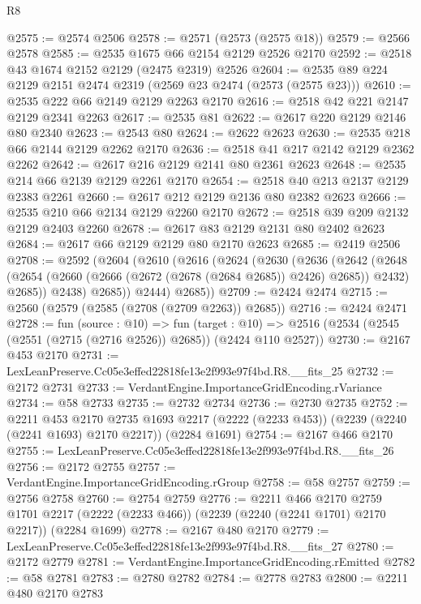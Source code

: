 \begin{lexlean}{R8}
\begin{coremodule}
@2575 := @2574 @2506
@2578 := @2571 (@2573 (@2575 @18))
@2579 := @2566 @2578
@2585 := @2535 @1675 @66 @2154 @2129 @2526 @2170
@2592 := @2518 @43 @1674 @2152 @2129 (@2475 @2319) @2526
@2604 := @2535 @89 @224 @2129 @2151 @2474 @2319 (@2569 @23 @2474 (@2573 (@2575 @23)))
@2610 := @2535 @222 @66 @2149 @2129 @2263 @2170
@2616 := @2518 @42 @221 @2147 @2129 @2341 @2263
@2617 := @2535 @81
@2622 := @2617 @220 @2129 @2146 @80 @2340
@2623 := @2543 @80
@2624 := @2622 @2623
@2630 := @2535 @218 @66 @2144 @2129 @2262 @2170
@2636 := @2518 @41 @217 @2142 @2129 @2362 @2262
@2642 := @2617 @216 @2129 @2141 @80 @2361 @2623
@2648 := @2535 @214 @66 @2139 @2129 @2261 @2170
@2654 := @2518 @40 @213 @2137 @2129 @2383 @2261
@2660 := @2617 @212 @2129 @2136 @80 @2382 @2623
@2666 := @2535 @210 @66 @2134 @2129 @2260 @2170
@2672 := @2518 @39 @209 @2132 @2129 @2403 @2260
@2678 := @2617 @83 @2129 @2131 @80 @2402 @2623
@2684 := @2617 @66 @2129 @2129 @80 @2170 @2623
@2685 := @2419 @2506
@2708 := @2592
    (@2604
      (@2610
        (@2616
          (@2624
            (@2630
              (@2636
                (@2642
                  (@2648
                    (@2654 (@2660 (@2666 (@2672 (@2678 (@2684 @2685)) @2426) @2685)) @2432)
                    @2685))
                @2438)
              @2685))
          @2444)
        @2685))
@2709 := @2424 @2474
@2715 := @2560 (@2579 (@2585 (@2708 (@2709 @2263)) @2685))
@2716 := @2424 @2471
@2728 := fun (source : @10) =>
  fun (target : @10) => @2516 (@2534 (@2545 (@2551 (@2715 (@2716 @2526)) @2685)) (@2424 @110 @2527))
@2730 := @2167 @453 @2170
@2731 := LexLeanPreserve.Cc05e3effed22818fe13e2f993e97f4bd.R8.__fits_25
@2732 := @2172 @2731
@2733 := VerdantEngine.ImportanceGridEncoding.rVariance
@2734 := @58 @2733
@2735 := @2732 @2734
@2736 := @2730 @2735
@2752 := @2211
    @453
    @2170
    @2735
    @1693
    @2217
    (@2222 (@2233 @453))
    (@2239 (@2240 (@2241 @1693) @2170 @2217))
    (@2284 @1691)
@2754 := @2167 @466 @2170
@2755 := LexLeanPreserve.Cc05e3effed22818fe13e2f993e97f4bd.R8.__fits_26
@2756 := @2172 @2755
@2757 := VerdantEngine.ImportanceGridEncoding.rGroup
@2758 := @58 @2757
@2759 := @2756 @2758
@2760 := @2754 @2759
@2776 := @2211
    @466
    @2170
    @2759
    @1701
    @2217
    (@2222 (@2233 @466))
    (@2239 (@2240 (@2241 @1701) @2170 @2217))
    (@2284 @1699)
@2778 := @2167 @480 @2170
@2779 := LexLeanPreserve.Cc05e3effed22818fe13e2f993e97f4bd.R8.__fits_27
@2780 := @2172 @2779
@2781 := VerdantEngine.ImportanceGridEncoding.rEmitted
@2782 := @58 @2781
@2783 := @2780 @2782
@2784 := @2778 @2783
@2800 := @2211
    @480
    @2170
    @2783

\end{coremodule}
\end{lexlean}
